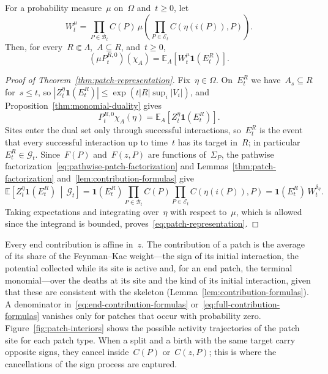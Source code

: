 \documentclass[EJP,preprint,NODS,nobera]{ejpecp}
\newcommand{\E}{\mathbb{E}}
\newcommand{\CE}[2]{\E\Cb{#1\,\middle|\,#2}}
\newcommand{\bb}[1]{\left(#1\right)}
\newcommand{\Cb}[1]{\left[#1\right]}
\newcommand{\abs}[1]{\left|#1\right|}
\newcommand{\ind}{\mathbf{1}}
\begin{document}
\begin{theorem}
\label{thm:patch-representation}
For a probability measure~$\mu$ on~$\Omega$ and~$t\geq0$, let
\begin{equation}
\label{eq:finite-horizon-weight}
W_t^\mu
=
\prod_{P\in\mathcal B_t}C(P)\,
\mu\bb{
\prod_{P\in\mathcal E_t}C\bb{\eta\bb{i(P)},P}
}.
\end{equation}
Then, for every~$R\Subset\Lambda$,~$A\subseteq R$, and~$t\geq0$,
\begin{equation}
\label{eq:patch-representation}
(\mu P_t^{R,0})(\chi_A)
=
\E_A\Cb{W_t^\mu\ind\bb{E_t^R}}.
\end{equation}
\end{theorem}

\begin{proof}[Proof of Theorem~\ref{thm:patch-representation}]
Fix~$\eta\in\Omega$. On~$E_t^R$ we have~$A_s\subseteq R$ for~$s\leq t$, so
$\abs{Z_t^\eta\ind(E_t^R)}\leq\exp\bb{t\abs R\sup_i\abs{V_i}}$, and
Proposition~\ref{thm:monomial-duality} gives
\begin{equation*}
P_t^{R,0}\chi_A(\eta)=\E_A\Cb{Z_t^\eta\ind\bb{E_t^R}}.
\end{equation*}
Sites enter the dual set only through successful interactions, so~$E_t^R$
is the event that every successful interaction up to time~$t$ has its target
in~$R$; in particular~$E_t^R\in\mathcal G_t$. Since~$F(P)$ and~$F(z,P)$ are
functions of~$\Sigma_P$, the pathwise factorization~\eqref{eq:pathwise-patch-factorization}
and Lemmas~\ref{thm:patch-factorization} and~\ref{lem:contribution-formulas}
give
\begin{equation*}
\CE{Z_t^\eta\ind\bb{E_t^R}}{\mathcal G_t}
=
\ind\bb{E_t^R}
\prod_{P\in\mathcal B_t}C(P)
\prod_{P\in\mathcal E_t}C\bb{\eta\bb{i(P)},P}
=\ind\bb{E_t^R}\,W_t^{\delta_\eta}.
\end{equation*}
Taking expectations and integrating over~$\eta$ with respect to~$\mu$, which
is allowed since the integrand is bounded, proves~\eqref{eq:patch-representation}.
\end{proof}

\begin{remark}
\label{rem:meaning-contributions}
Every end contribution is affine in~$z$. The contribution of a patch is the
average of its share of the Feynman--Kac weight---the sign of its initial
interaction, the potential collected while its site is active and, for an end
patch, the terminal monomial---over the deaths at its site and the kind of its
initial interaction, given that these are consistent with the skeleton
(Lemma~\ref{lem:contribution-formulas}). A denominator
in~\eqref{eq:end-contribution-formulas}
or~\eqref{eq:full-contribution-formulas} vanishes only for patches that occur
with probability zero. Figure~\ref{fig:patch-interiors} shows the possible
activity trajectories of the patch site for each patch type. When a split and
a birth with the same target carry opposite signs, they cancel inside~$C(P)$
or~$C(z,P)$; this is where the cancellations of the sign process are
captured.
\end{remark}
\end{document}
